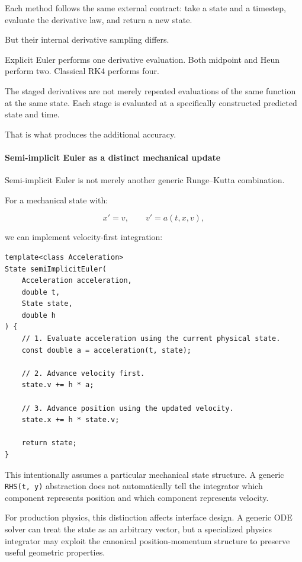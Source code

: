 Each method follows the same external contract: take a state and a timestep, evaluate the derivative law, and return a new state.

But their internal derivative sampling differs.

Explicit Euler performs one derivative evaluation. Both midpoint and Heun perform two. Classical RK4 performs four.

The staged derivatives are not merely repeated evaluations of the same function at the same state. Each stage is evaluated at a specifically constructed predicted state and time.

That is what produces the additional accuracy.

\paragraph{Semi-implicit Euler as a distinct mechanical update}\label{02-foundations-ii-ch025-semi-implicit-euler-as-a-distinct-mechanical-update}

Semi-implicit Euler is not merely another generic Runge--Kutta combination.

For a mechanical state with:

\[
x'=v,\qquad v'=a(t,x,v),
\]

we can implement velocity-first integration:

\begin{verbatim}
template<class Acceleration>
State semiImplicitEuler(
    Acceleration acceleration,
    double t,
    State state,
    double h
) {
    // 1. Evaluate acceleration using the current physical state.
    const double a = acceleration(t, state);

    // 2. Advance velocity first.
    state.v += h * a;

    // 3. Advance position using the updated velocity.
    state.x += h * state.v;

    return state;
}
\end{verbatim}

This intentionally assumes a particular mechanical state structure. A generic \texttt{RHS(t,\ y)} abstraction does not automatically tell the integrator which component represents position and which component represents velocity.

For production physics, this distinction affects interface design. A generic ODE solver can treat the state as an arbitrary vector, but a specialized physics integrator may exploit the canonical position-momentum structure to preserve useful geometric properties.

